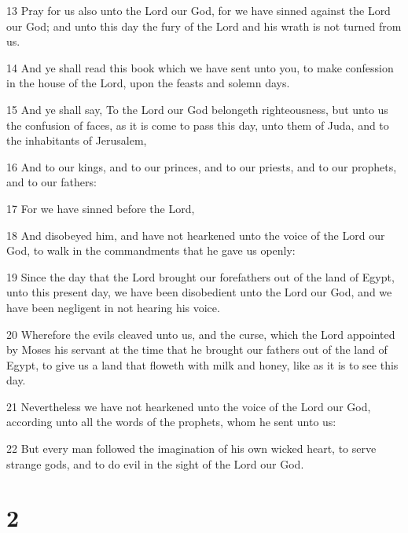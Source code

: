 \par 13 Pray for us also unto the Lord our God, for we have sinned against the Lord our God; and unto this day the fury of the Lord and his wrath is not turned from us.
\par 14 And ye shall read this book which we have sent unto you, to make confession in the house of the Lord, upon the feasts and solemn days.
\par 15 And ye shall say, To the Lord our God belongeth righteousness, but unto us the confusion of faces, as it is come to pass this day, unto them of Juda, and to the inhabitants of Jerusalem,
\par 16 And to our kings, and to our princes, and to our priests, and to our prophets, and to our fathers:
\par 17 For we have sinned before the Lord,
\par 18 And disobeyed him, and have not hearkened unto the voice of the Lord our God, to walk in the commandments that he gave us openly:
\par 19 Since the day that the Lord brought our forefathers out of the land of Egypt, unto this present day, we have been disobedient unto the Lord our God, and we have been negligent in not hearing his voice.
\par 20 Wherefore the evils cleaved unto us, and the curse, which the Lord appointed by Moses his servant at the time that he brought our fathers out of the land of Egypt, to give us a land that floweth with milk and honey, like as it is to see this day.
\par 21 Nevertheless we have not hearkened unto the voice of the Lord our God, according unto all the words of the prophets, whom he sent unto us:
\par 22 But every man followed the imagination of his own wicked heart, to serve strange gods, and to do evil in the sight of the Lord our God.

\chapter{2}

